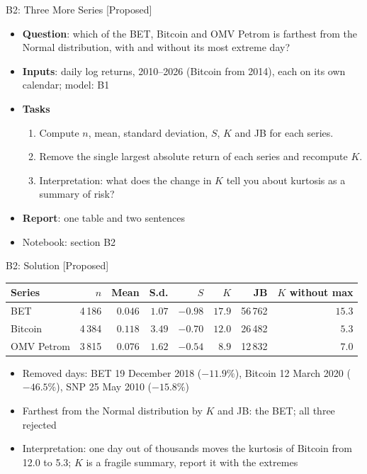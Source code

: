 \begin{frame}{B2: Three More Series [Proposed]}
\itemsize{\footnotesize}
\begin{itemize}
\item \textbf{Question}: which of the BET, Bitcoin and OMV Petrom is farthest from the Normal distribution, with and without its most extreme day?
\item \textbf{Inputs}: daily log returns, 2010--2026 (Bitcoin from 2014), each on its own calendar; model: B1
\item \textbf{Tasks}
\begin{enumerate}
    \item Compute $n$, mean, standard deviation, $S$, $K$ and JB for each series.
    \item Remove the single largest absolute return of each series and recompute $K$.
    \item Interpretation: what does the change in $K$ tell you about kurtosis as a summary of risk?
\end{enumerate}
\item \textbf{Report}: one table and two sentences
\item Notebook: section B2
\end{itemize}
\end{frame}

\ifsolutions
\begin{frame}{B2: Solution [Proposed]}
\itemsize{\footnotesize}
\begin{center}
\footnotesize
\begin{tabular}{lrrrrrrr}
\toprule
Series & $n$ & Mean & S.d. & $S$ & $K$ & JB & $K$ without max \\
\midrule
BET & 4\,186 & $0.046$ & $1.07$ & $-0.98$ & $17.9$ & 56\,762 & $15.3$ \\
Bitcoin & 4\,384 & $0.118$ & $3.49$ & $-0.70$ & $12.0$ & 26\,482 & $5.3$ \\
OMV Petrom & 3\,815 & $0.076$ & $1.62$ & $-0.54$ & $8.9$ & 12\,832 & $7.0$ \\
\bottomrule
\end{tabular}
\end{center}
\begin{itemize}
    \item Removed days: BET 19 December 2018 ($-11.9\%$), Bitcoin 12 March 2020 ($-46.5\%$), SNP 25 May 2010 ($-15.8\%$)
    \item Farthest from the Normal distribution by $K$ and JB: the BET; all three rejected
    \item Interpretation: one day out of thousands moves the kurtosis of Bitcoin from 12.0 to 5.3; $K$ is a fragile summary, report it with the extremes
\end{itemize}
\end{frame}
\fi

